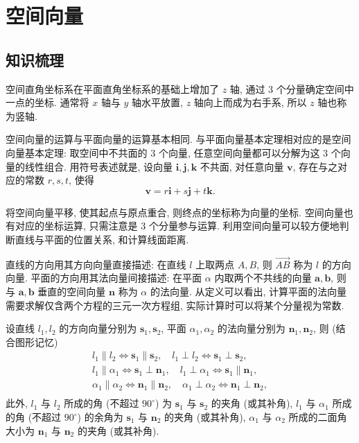 
\section{空间向量}

\subsection{知识梳理}

空间直角坐标系在平面直角坐标系的基础上增加了 $z$ 轴, 通过 $3$ 个分量确定空间中一点的坐标. 通常将 $x$ 轴与 $y$ 轴水平放置, $z$ 轴向上而成为右手系, 所以 $z$ 轴也称为竖轴.

空间向量的运算与平面向量的运算基本相同. 与平面向量基本定理相对应的是空间向量基本定理: 取空间中不共面的 $3$ 个向量, 任意空间向量都可以分解为这 $3$ 个向量的线性组合. 用符号表述就是, 设向量 $\bm{i}, \bm{j}, \bm{k}$ 不共面, 对任意向量 $\bm{v}$, 存在与之对应的常数 $r,s,t$, 使得
\[\bm{v}= r\bm{i}+ s\bm{j}+ t\bm{k}.\]

将空间向量平移, 使其起点与原点重合, 则终点的坐标称为向量的坐标. 空间向量也有对应的坐标运算, 只需注意是 $3$ 个分量参与运算. 利用空间向量可以较方便地判断直线与平面的位置关系, 和计算线面距离.

直线的方向用其方向向量直接描述: 在直线 $l$ 上取两点 $A,B$, 则 $\overrightarrow{AB}$ 称为 $l$ 的方向向量. 平面的方向用其法向量间接描述: 在平面 $\alpha$ 内取两个不共线的向量 $\bm{a}, \bm{b}$, 则与 $\bm{a}, \bm{b}$ 垂直的空间向量 $\bm{n}$ 称为 $\alpha$ 的法向量. 从定义可以看出, 计算平面的法向量需要求解仅含两个方程的三元一次方程组, 实际计算时可以将某个分量视为常数.

设直线 $l_1, l_2$ 的方向向量分别为 $\bm{s}_1, \bm{s}_2$, 平面 $\alpha_1, \alpha_2$ 的法向量分别为 $\bm{n}_1, \bm{n}_2$, 则 (结合图形记忆)
\[\begin{gathered}
    l_1\parallel l_2 \Leftrightarrow \bm{s}_1\parallel \bm{s}_2,\quad
    l_1\perp l_2 \Leftrightarrow \bm{s}_1\perp \bm{s}_2,\\
    l_1\parallel \alpha_1 \Leftrightarrow \bm{s}_1\perp \bm{n}_1,\quad
    l_1\perp \alpha_1 \Leftrightarrow \bm{s}_1\parallel \bm{n}_1,\\
    \alpha_1\parallel \alpha_2 \Leftrightarrow \bm{n}_1\parallel \bm{n}_2,\quad
    \alpha_1\perp \alpha_2 \Leftrightarrow \bm{n}_1\perp \bm{n}_2,\\
\end{gathered}\]
此外, $l_1$ 与 $l_2$ 所成的角 (不超过 $90^\circ$) 为 $\bm{s}_1$ 与 $\bm{s}_2$ 的夹角 (或其补角), $l_1$ 与 $\alpha_1$ 所成的角 (不超过 $90^\circ$) 的余角为 $\bm{s}_1$ 与 $\bm{n}_2$ 的夹角 (或其补角), $\alpha_1$ 与 $\alpha_2$ 所成的二面角大小为 $\bm{n}_1$ 与 $\bm{n}_2$ 的夹角 (或其补角).

